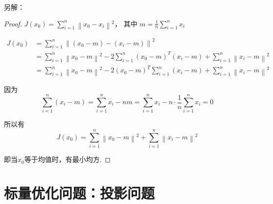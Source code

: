 另解：

\begin{proof}
    $ J\left(x_{0}\right)=\sum_{i=1}^{n}\left\|x_{0}-x_{i}\right\|^{2} ， $ 其中 $ m=\frac{1}{n} \sum_{i=1}^{n} x_{i} $

    $$\begin{aligned}
        J\left(x_{0}\right)&=\sum_{i=1}^{n}\left\|\left(x_{0}-m\right)-\left(x_{i}-m\right)\right\|^{2} \\
        &=\sum_{i=1}^{n}\left\|x_{0}-m\right\|^{2}-2 \sum_{i=1}^{n}\left(x_{0}-m\right)^{T}\left(x_{i}-m\right)+\sum_{i=1}^{n}\left\|x_{i}-m\right\|^{2} \\
        &= \sum_{i=1}^{n}\left\|x_{0}-m\right\|^{2}-2\left(x_{0}-m\right)^{T} \sum_{i=1}^{n}\left(x_{i}-m\right)+\sum_{i=1}^{n}\left\|x_{i}-m\right\|^{2}
    \end{aligned}$$


因为
$$ \sum_{i=1}^{n}\left(x_{i}-m\right)=\sum_{i=1}^{n} x_{i}-n m=\sum_{i=1}^{n} x_{i}-n \cdot \frac{1}{n} \sum_{i=1}^{n} x_{i}=0 $$

所以有 $$ J\left(x_{0}\right)=\sum_{i=1}^{n}\left\|x_{0}-m\right\|^{2}+\sum_{i=1}^{n}\left\|x_{i}-m\right\|^{2} $$

即当$x_0$等于均值时，有最小均方.
\end{proof}

\section{标量优化问题：投影问题}

